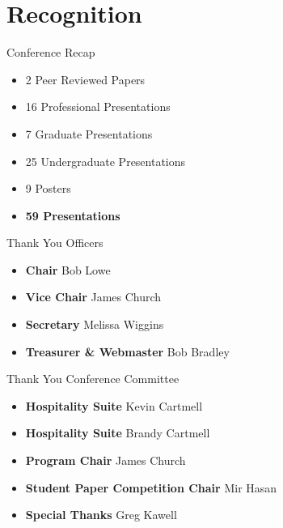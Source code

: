 \documentclass[]{beamer}
\begin{document}
\section{Recognition}
\begin{frame}{Conference Recap}
    \begin{itemize}[<+(1)->]
        \item 2 Peer Reviewed Papers
        \item 16 Professional Presentations
        \item 7 Graduate Presentations
        \item 25 Undergraduate Presentations
        \item 9 Posters
        \item \textbf{59 Presentations}
    \end{itemize}
\end{frame}

\begin{frame}{Thank You Officers}
    \begin{itemize}[<+(1)->]
        \item \textbf{Chair} Bob Lowe
        \item \textbf{Vice Chair} James Church
        \item \textbf{Secretary} Melissa Wiggins
        \item \textbf{Treasurer \& Webmaster} Bob Bradley
    \end{itemize}
\end{frame}

\begin{frame}{Thank You Conference Committee}
    \begin{itemize}[<+(1)->]
        \item \textbf{Hospitality Suite} Kevin Cartmell
        \item \textbf{Hospitality Suite} Brandy Cartmell
        \item \textbf{Program Chair} James Church
        \item \textbf{Student Paper Competition Chair} Mir Hasan
        \item \textbf{Special Thanks} Greg Kawell
    \end{itemize}
\end{frame}
\end{document}
